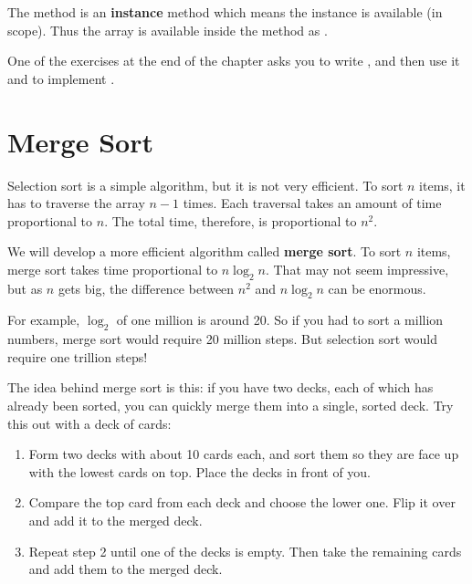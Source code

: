The method  is an \textbf{instance} method which means the instance  is available (in scope).  Thus the  array is available inside the method as .

One of the exercises at the end of the chapter asks you to write , and then use it and  to implement .


\section{Merge Sort}
\label{mergesort}


Selection sort is a simple algorithm, but it is not very efficient.
To sort $n$ items, it has to traverse the array $n-1$ times.
Each traversal takes an amount of time proportional to $n$.
The total time, therefore, is proportional to $n^2$.


We will develop a more efficient algorithm called {\bf merge sort}.
To sort $n$ items, merge sort takes time proportional to $n \log_2 n$.
That may not seem impressive, but as $n$ gets big, the difference between $n^2$ and $n \log_2 n$ can be enormous.

For example, $\log_2$ of one million is around 20.
So if you had to sort a million numbers, merge sort would require 20 million steps.
But selection sort would require one trillion steps!

The idea behind merge sort is this: if you have two decks, each of which has already been sorted, you can quickly merge them into a single, sorted deck.
Try this out with a deck of cards:

\begin{enumerate}

\item Form two decks with about 10 cards each, and sort them so they are face up with the lowest cards on top.
Place the decks in front of you.

\item Compare the top card from each deck and choose the lower one.
Flip it over and add it to the merged deck.

\item Repeat step 2 until one of the decks is empty.
Then take the remaining cards and add them to the merged deck.

\end{enumerate}

